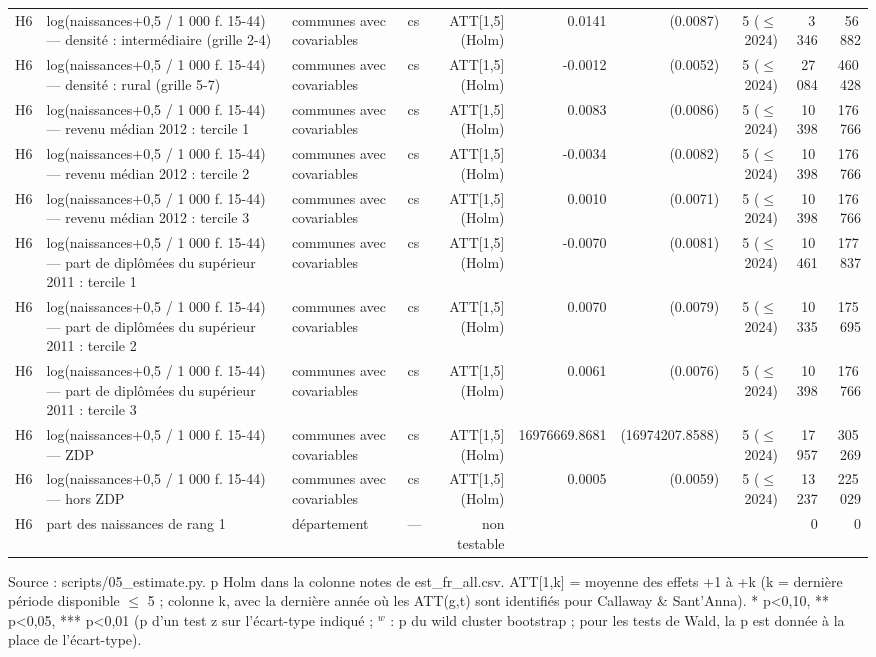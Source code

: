 \begin{table}
\begin{threeparttable}
\begin{tabular}{lp{6.0cm}p{4.4cm}lrrrrrr}
H6 & log(naissances+0,5 / 1 000 f. 15-44) — densité : intermédiaire (grille 2-4) & communes avec covariables & cs & ATT[1,5] (Holm) & 0.0141 & (0.0087) & 5 ($\leq$ 2024) & 3\,346 & 56\,882 \\
H6 & log(naissances+0,5 / 1 000 f. 15-44) — densité : rural (grille 5-7) & communes avec covariables & cs & ATT[1,5] (Holm) & -0.0012 & (0.0052) & 5 ($\leq$ 2024) & 27\,084 & 460\,428 \\
H6 & log(naissances+0,5 / 1 000 f. 15-44) — revenu médian 2012 : tercile 1 & communes avec covariables & cs & ATT[1,5] (Holm) & 0.0083 & (0.0086) & 5 ($\leq$ 2024) & 10\,398 & 176\,766 \\
H6 & log(naissances+0,5 / 1 000 f. 15-44) — revenu médian 2012 : tercile 2 & communes avec covariables & cs & ATT[1,5] (Holm) & -0.0034 & (0.0082) & 5 ($\leq$ 2024) & 10\,398 & 176\,766 \\
H6 & log(naissances+0,5 / 1 000 f. 15-44) — revenu médian 2012 : tercile 3 & communes avec covariables & cs & ATT[1,5] (Holm) & 0.0010 & (0.0071) & 5 ($\leq$ 2024) & 10\,398 & 176\,766 \\
H6 & log(naissances+0,5 / 1 000 f. 15-44) — part de diplômées du supérieur 2011 : tercile 1 & communes avec covariables & cs & ATT[1,5] (Holm) & -0.0070 & (0.0081) & 5 ($\leq$ 2024) & 10\,461 & 177\,837 \\
H6 & log(naissances+0,5 / 1 000 f. 15-44) — part de diplômées du supérieur 2011 : tercile 2 & communes avec covariables & cs & ATT[1,5] (Holm) & 0.0070 & (0.0079) & 5 ($\leq$ 2024) & 10\,335 & 175\,695 \\
H6 & log(naissances+0,5 / 1 000 f. 15-44) — part de diplômées du supérieur 2011 : tercile 3 & communes avec covariables & cs & ATT[1,5] (Holm) & 0.0061 & (0.0076) & 5 ($\leq$ 2024) & 10\,398 & 176\,766 \\
H6 & log(naissances+0,5 / 1 000 f. 15-44) — ZDP & communes avec covariables & cs & ATT[1,5] (Holm) & 16976669.8681 & (16974207.8588) & 5 ($\leq$ 2024) & 17\,957 & 305\,269 \\
H6 & log(naissances+0,5 / 1 000 f. 15-44) — hors ZDP & communes avec covariables & cs & ATT[1,5] (Holm) & 0.0005 & (0.0059) & 5 ($\leq$ 2024) & 13\,237 & 225\,029 \\
H6 & part des naissances de rang 1 & département & — & non testable &  &  &  & 0 & 0 \\
\bottomrule
\end{tabular}
\begin{tablenotes}\footnotesize
\item Source : scripts/05\_estimate.py. p Holm dans la colonne notes de est\_fr\_all.csv. ATT[1,k] = moyenne des effets +1 à +k (k = dernière période disponible $\leq$ 5 ; colonne k, avec la dernière année où les ATT(g,t) sont identifiés pour Callaway \& Sant'Anna). * p<0,10, ** p<0,05, *** p<0,01 (p d'un test z sur l'écart-type indiqué ; $^{w}$ : p du wild cluster bootstrap ; pour les tests de Wald, la p est donnée à la place de l'écart-type).
\end{tablenotes}
\end{threeparttable}
\end{table}
